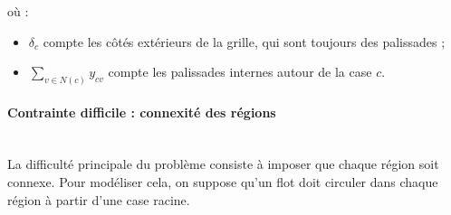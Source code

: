 où :
\begin{itemize}
    \item \(\delta_c\) compte les côtés extérieurs de la grille, qui sont toujours des palissades ;
    \item \(\sum_{v \in N(c)} y_{cv}\) compte les palissades internes autour de la case \(c\).
\end{itemize}

\paragraph{Contrainte difficile : connexité des régions}
\mbox{}\\

La difficulté principale du problème consiste à imposer que chaque région soit connexe. Pour modéliser cela, on suppose qu'un flot doit circuler dans chaque région à partir d'une case racine.

